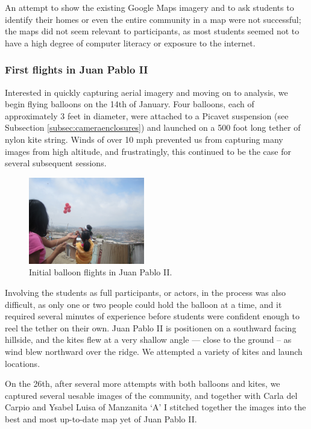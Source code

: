 \documentclass[11pt,oneside,notitlepage]{report}
\begin{document}
An attempt to show the existing Google Maps imagery and to ask students to identify their homes or even the entire community in a map were not successful; the maps did not seem relevant to participants, as most students seemed not to have a high degree of computer literacy or exposure to the internet. 

\subsubsection{First flights in Juan Pablo II}

Interested in quickly capturing aerial imagery and moving on to analysis, we begin flying balloons on the 14th of January. Four balloons, each of approximately 3 feet in diameter, were attached to a Picavet suspension (see Subsection \ref{subsec:cameraenclosures}) and launched on a 500 foot long tether of nylon kite string. Winds of over 10 mph prevented us from capturing many images from high altitude, and frustratingly, this continued to be the case for several subsequent sessions. 

\begin{figure}
	\begin{flushright}
		\includegraphics[width=0.45\textwidth]{images/juan-pablo-first-flight.jpg}
		\caption{Initial balloon flights in Juan Pablo II.}
	\end{flushright}
\end{figure}

Involving the students as full participants, or actors, in the process was also difficult, as only one or two people could hold the balloon at a time, and it required several minutes of experience before students were confident enough to reel the tether on their own. Juan Pablo II is positionen on a southward facing hillside, and the kites flew at a very shallow angle --- close to the ground -- as wind blew northward over the ridge. We attempted a variety of kites and launch locations. 

On the 26th, after several more attempts with both balloons and kites, we captured several uesable images of the community, and together with Carla del Carpio and Ysabel Luisa of Manzanita `A' I stitched together the images into the best and most up-to-date map yet of Juan Pablo II.  
\end{document}
